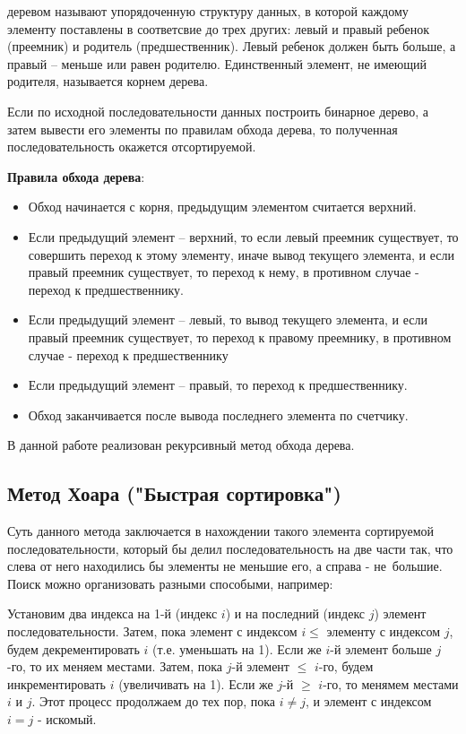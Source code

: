 \documentclass[a4paper,11pt]{article}
\begin{document}
  { деревом} называют упорядоченную структуру данных, в которой каждому элементу поставлены в соответсвие до трех других: левый и  правый ребенок (преемник) и родитель (пред\-шественник).
Левый ребенок должен быть больше, а правый -- меньше или равен родителю. Единственный элемент, не имеющий родителя, называется корнем дерева.
 
  Если по исходной последовательности данных построить бинарное дерево, а затем вывести его элементы по правилам обхода дерева, то  полученная последовательность окажется отсортируемой.

  {\bf Правила обхода дерева}:
\begin{itemize}
    \item Обход начинается с корня, предыдущим  элементом считается верхний.
    \item Если предыдущий элемент -- верхний, то если левый преемник существует, то совершить переход к этому элементу, иначе вывод текущего элемента, и если правый преемник существует, то переход к нему, в противном случае - переход к предшественнику.
    \item Если предыдущий элемент -- левый, то вывод текущего элемента, и если правый преемник существует, то переход к правому преемнику, в противном случае - переход к предшественнику
    \item Если предыдущий элемент -- правый, то переход к предшественнику.
    \item Обход заканчивается  после вывода последнего элемента по счетчику.
\end{itemize}

В данной работе реализован рекурсивный метод обхода дерева. 

\begin{center}
  \subsection{  Метод Хоара ("Быстрая сортировка")}
\end{center}

    Суть данного метода заключается в нахождении такого элемента сортируемой последова\-тельности, который бы делил
последовательность на две части так, что слева от него находились бы элементы не меньшие его, а справа - не\ 
 большие. Поиск можно организовать разными способыми, например: 

Установим два индекса на 1-й (индекс $i$) и на последний (индекс $j$) элемент последова\-тельности. Затем,
пока элемент с индексом $i \le$ элементу с индексом $j$, будем декремен\-тировать $i$ (т.е. уменьшать на 1). 
Если же $i$-й элемент больше $j$-го, то их  меняем местами. Затем, пока $j$-й элемент $\le$ $i$-го, будем 
инкрементировать $i$ (увеличивать на 1). Если же $j$-й $\ge$ $i$-го, то менямем местами $i$ и $j$. Этот процесс
продолжаем до тех пор, пока $i \ne j$, и элемент с индексом $i = j $ - искомый. 
\end{document}
